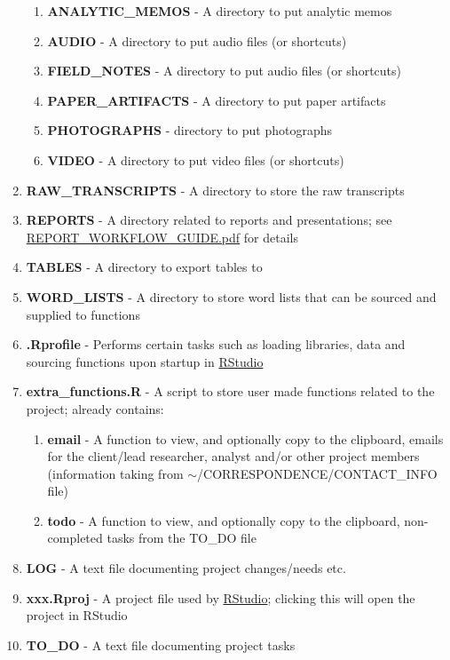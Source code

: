 \documentclass{article}\usepackage[]{graphicx}\usepackage[]{color}
\begin{document}
\begin{enumerate}
  \begin{enumerate}
     \item \textbf{ANALYTIC\_MEMOS} - A directory to put analytic memos
     \item \textbf{AUDIO} - A directory to put audio files (or shortcuts)
     \item \textbf{FIELD\_NOTES} - A directory to put audio files (or shortcuts)
     \item \textbf{PAPER\_ARTIFACTS} - A directory to put paper artifacts 
     \item \textbf{PHOTOGRAPHS} - directory to put photographs
     \item \textbf{VIDEO} - A directory to put video files (or shortcuts)
  \end{enumerate}  
  \item \textbf{RAW\_TRANSCRIPTS} - A directory to store the raw transcripts
  \item \textbf{REPORTS} - A directory related to reports and presentations; see \href{https://dl.dropbox.com/u/61803503/packages/REPORT_WORKFLOW_GUIDE.pdf}{REPORT\_WORKFLOW\_GUIDE.pdf} for details
  \item \textbf{TABLES} - A directory to export tables to 
  \item \textbf{WORD\_LISTS} - A directory to store word lists that can be sourced and supplied to functions
  \item \textbf{.Rprofile} - Performs certain tasks such as loading libraries, 
      data and sourcing functions upon startup in \href{http://www.rstudio.com/}{RStudio}
  \item \textbf{extra\_functions.R} - A script to store user made functions related to the project; already contains:
  \begin{enumerate}
     \item \textbf{email} - A function to view, and optionally copy to the clipboard, emails for the client/lead researcher, analyst and/or other project members (information taking from \newline$\sim$/CORRESPONDENCE/CONTACT\_INFO file)
     \item \textbf{todo} - A function to view, and optionally copy to the clipboard, non-completed tasks from the TO\_DO file
  \end{enumerate}   
  \item \textbf{LOG} - A text file documenting project changes/needs etc.
  \item \textbf{xxx.Rproj} - A project file used by \href{http://www.rstudio.com/}{RStudio}; clicking this will open the project in RStudio
  \item \textbf{TO\_DO} - A text file documenting project tasks 
\end{enumerate}
\end{document}
